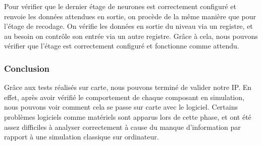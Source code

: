 Pour vérifier que le dernier étage de neurones est correctement configuré et
renvoie les données attendues en sortie, on procède de la même manière que pour
l'étage de recodage.
On vérifie les données en sortie du niveau via un registre, et au besoin on
contrôle son entrée via un autre registre. Grâce à cela, nous pouvons vérifier
que l'étage est correctement configuré et fonctionne comme attendu.


\subsubsection{Conclusion}

Grâce aux tests réalisés sur carte, nous pouvons terminé de valider notre IP.
En effet, après avoir vérifié le comportement de chaque composant en simulation,
nous pouvons voir comment cela se passe sur carte avec le logiciel.
Certains problèmes logiciels comme matériels sont apparus lors de cette phase,
et ont été assez difficiles à analyser correctement à cause du manque
d'information par rapport à une simulation classique sur ordinateur.
